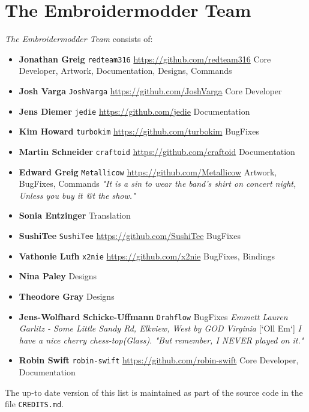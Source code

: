 
\section*{The Embroidermodder Team}

\emph{The Embroidermodder Team} consists of:

\begin{itemize}
\item \textbf{Jonathan Greig} \texttt{redteam316} \url{https://github.com/redteam316} Core Developer, Artwork, Documentation, Designs, Commands
\item \textbf{Josh Varga} \texttt{JoshVarga} \url{https://github.com/JoshVarga} Core Developer
\item \textbf{Jens Diemer} \texttt{jedie} \url{https://github.com/jedie} Documentation
\item \textbf{Kim Howard} \texttt{turbokim} \url{https://github.com/turbokim} BugFixes
\item \textbf{Martin Schneider} \texttt{craftoid} \url{https://github.com/craftoid} Documentation
\item \textbf{Edward Greig} \texttt{Metallicow} \url{https://github.com/Metallicow} Artwork, BugFixes, Commands \emph{"It is a sin to wear the band's shirt on concert night, Unless you buy it @t the show."}
\item \textbf{Sonia Entzinger} Translation
\item \textbf{SushiTee} \texttt{SushiTee} \url{https://github.com/SushiTee} BugFixes
\item \textbf{Vathonie Lufh} \texttt{x2nie} \url{https://github.com/x2nie} BugFixes, Bindings
\item \textbf{Nina Paley} Designs
\item \textbf{Theodore Gray} Designs
\item \textbf{Jens-Wolfhard Schicke-Uffmann} \texttt{Drahflow} BugFixes
 \emph{Emmett Lauren Garlitz - Some Little Sandy Rd, Elkview, West by GOD Virginia} [`Oll Em`] \emph{I have a nice cherry chess-top(Glass). "But remember, I NEVER played on it."}
\item \textbf{Robin Swift} \texttt{robin-swift} \url{https://github.com/robin-swift} Core Developer, Documentation
\end{itemize}

The up-to date version of this list is maintained as part of the source code in the file \texttt{CREDITS.md}.
